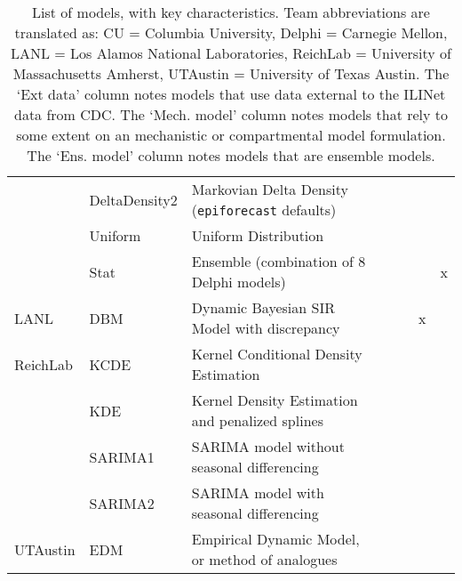 \begin{table}
\begin{tabular}{p{1.6cm} l p{7.5cm} l  p{1cm}  p{1cm} p{1cm}}
~        & DeltaDensity2      & Markovian Delta Density ({\tt epiforecast} defaults)& \cite{Brooks2018} & ~             & ~          &          \\ 
~        & Uniform            & Uniform Distribution&  & ~             & ~   &                 \\ 
~        & Stat               & Ensemble (combination of 8 Delphi models)& \cite{Brooks2018} & ~             & ~  & x                 \\
\hline
LANL     & DBM                & Dynamic Bayesian SIR Model with discrepancy & \cite{Osthus2017} & ~             & x      &              \\ 
\hline
ReichLab & KCDE               & Kernel Conditional Density Estimation & \cite{Ray2017}  & ~             & ~            &        \\ 
~        & KDE                & Kernel Density Estimation and penalized splines & \cite{Ray2018}  & ~             & ~     &               \\ 
~        & SARIMA1            & SARIMA model without seasonal differencing & \cite{Ray2018} & ~             & ~      &              \\ 
~        & SARIMA2            & SARIMA model with seasonal differencing & \cite{Ray2018} & ~             & ~           &         \\ 
\hline
UTAustin & EDM                & Empirical Dynamic Model, or method of analogues & \cite{Sugihara1990} & ~             & ~         &           \\ 
\end{tabular}
\caption{List of models, with key characteristics. Team abbreviations are translated as: CU = Columbia University, Delphi = Carnegie Mellon, LANL = Los Alamos National Laboratories, ReichLab = University of Massachusetts Amherst, UTAustin = University of Texas Austin.  The `Ext data' column notes models that use data external to the ILINet data from CDC. The `Mech. model' column notes models that rely to some extent on an mechanistic or compartmental model formulation. The `Ens. model' column notes models that are ensemble models.}
\label{tab:model-list}
\end{table}